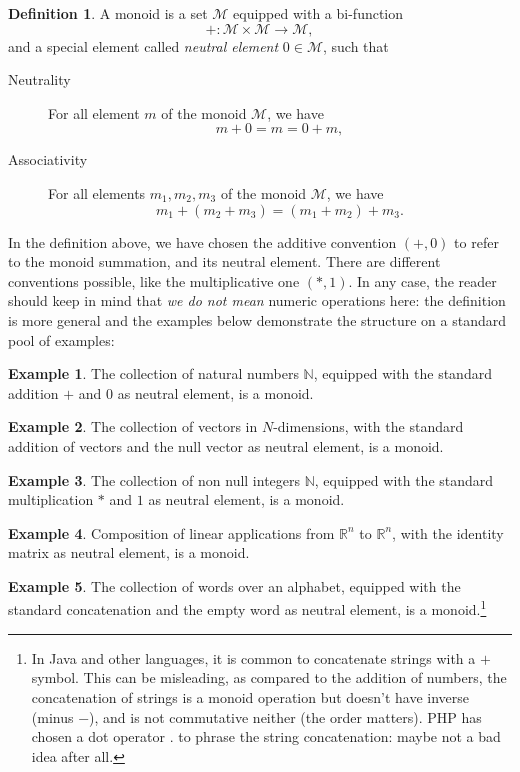 \documentclass[12pt,a4paper]{report}
\theoremstyle{theorem}
\theoremstyle{definition}
\newtheorem{definition}{Definition}
\newtheorem{example}{Example}
\begin{document}
\begin{definition}
A monoid is a set $\mathcal{M}$ equipped with a bi-function
	\[ + : \mathcal{M}\times \mathcal{M} \to \mathcal{M} ,\]
and a special element called \emph{neutral element} $0\in\mathcal{M}$,
such that
	\begin{description}
		\item[Neutrality] For all element $m$ of the monoid $\mathcal{M}$,
		we have
			\[ m + 0 = m = 0 + m ,\]
		\item[Associativity] For all elements $m_1,m_2,m_3$ of the monoid
		$\mathcal{M}$, we have
			\[ m_1 + (m_2 + m_3) = (m_1 + m_2) + m_3 .\]
	\end{description}
\end{definition}
In the definition above, we have chosen the additive convention $(+,0)$
to refer to the monoid summation, and its neutral element. There are different
conventions possible, like the multiplicative one $(*,1)$.
In any case, the reader should keep in mind that \emph{we do not mean}
numeric operations here: the definition is more general and the examples
below demonstrate the structure on a standard pool of examples:
\begin{example}
The collection of natural numbers $\mathbb{N}$, equipped with the standard
addition $+$ and $0$ as neutral element, is a monoid.
\end{example}
\begin{example}
The collection of vectors in $N$-dimensions, with the standard addition of
vectors and the null vector as neutral element, is a monoid.
\end{example}
\begin{example}
The collection of non null integers $\mathbb{N}$, equipped with the standard
multiplication $*$ and $1$ as neutral element, is a monoid.
\end{example}
\begin{example}
Composition of linear applications from $\mathbb{R}^n$ to $\mathbb{R}^n$,
with the identity matrix as neutral element, is a monoid.
\end{example}
\begin{example}
The collection of words over an alphabet, equipped with the standard
concatenation and the empty word as neutral element, is a monoid.\footnote{In
Java and other languages, it is common to concatenate strings with a $+$
symbol. This can be misleading, as compared to the addition of numbers, the
concatenation of strings is a monoid operation but doesn't have inverse
(minus $-$), and is not commutative neither (the order matters). PHP has chosen
a dot operator $.$ to phrase the string concatenation: maybe not a bad idea
after all.}
\end{example}
\end{document}
